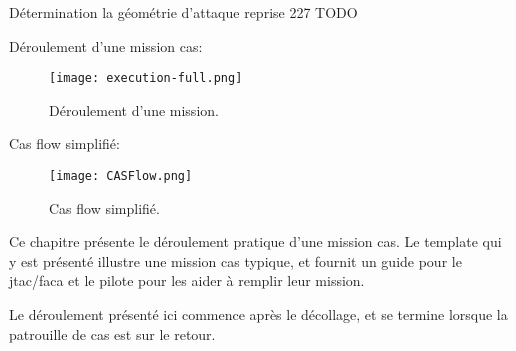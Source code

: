 			\ed
       	\ed
    \ed
    \item Détermination la géométrie d'attaque reprise 227 TODO
\ed


\e
    \item Déroulement d'une mission \gls{cas}:
    \begin{figure}[H]
        \texttt{[image: execution-full.png]}
        \caption{Déroulement d'une mission.}
        \label{fig:casflow-full}
    \end{figure}
    \item Cas flow simplifié:
    \begin{figure}[H]
        \texttt{[image: CASFlow.png]}
        \caption{Cas flow simplifié.}
        \label{fig:casflow}
    \end{figure}
\ed

\e
    \item
    Ce chapitre présente le déroulement pratique d’une mission \acrshort{cas}. Le template qui y est présenté illustre une mission \acrshort{cas} typique, et fournit un guide pour le \acrshort{jtac}/\acrshort{faca} et le pilote pour les aider à remplir leur mission.
    \item Le déroulement présenté ici commence après le décollage, et se termine lorsque la patrouille de \acrshort{cas} est sur le retour.
\ed

